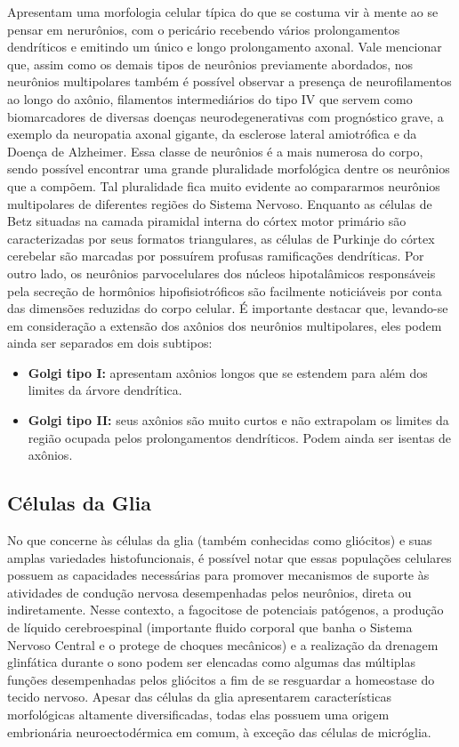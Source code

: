 \documentclass[
]{book}
\providecommand{\tightlist}{%
  \setlength{\itemsep}{0pt}\setlength{\parskip}{0pt}}
\theoremstyle{definition}
\theoremstyle{definition}
\theoremstyle{definition}
\theoremstyle{definition}
\theoremstyle{remark}
\begin{document}
Apresentam uma morfologia celular típica do que se costuma vir à mente ao se pensar em nerurônios, com o pericário recebendo vários prolongamentos dendríticos e emitindo um único e longo prolongamento axonal. Vale mencionar que, assim como os demais tipos de neurônios previamente abordados, nos neurônios multipolares também é possível observar a presença de neurofilamentos ao longo do axônio, filamentos intermediários do tipo IV que servem como biomarcadores de diversas doenças neurodegenerativas com prognóstico grave, a exemplo da neuropatia axonal gigante, da esclerose lateral amiotrófica e da Doença de Alzheimer. Essa classe de neurônios é a mais numerosa do corpo, sendo possível encontrar uma grande pluralidade morfológica dentre os neurônios que a compõem. Tal pluralidade fica muito evidente ao compararmos neurônios multipolares de diferentes regiões do Sistema Nervoso. Enquanto as células de Betz situadas na camada piramidal interna do córtex motor primário são caracterizadas por seus formatos triangulares, as células de Purkinje do córtex cerebelar são marcadas por possuírem profusas ramificações dendríticas. Por outro lado, os neurônios parvocelulares dos núcleos hipotalâmicos responsáveis pela secreção de hormônios hipofisiotróficos são facilmente noticiáveis por conta das dimensões reduzidas do corpo celular. É importante destacar que, levando-se em consideração a extensão dos axônios dos neurônios multipolares, eles podem ainda ser separados em dois subtipos:

\begin{itemize}
\tightlist
\item
  \textbf{Golgi tipo I:} apresentam axônios longos que se estendem para além dos limites da árvore dendrítica.
\item
  \textbf{Golgi tipo II:} seus axônios são muito curtos e não extrapolam os limites da região ocupada pelos prolongamentos dendríticos. Podem ainda ser isentas de axônios.
\end{itemize}

\hypertarget{cuxe9lulas-da-glia}{%
\subsection*{Células da Glia}\label{cuxe9lulas-da-glia}}

No que concerne às células da glia (também conhecidas como gliócitos) e suas amplas variedades histofuncionais, é possível notar que essas populações celulares possuem as capacidades necessárias para promover mecanismos de suporte às atividades de condução nervosa desempenhadas pelos neurônios, direta ou indiretamente. Nesse contexto, a fagocitose de potenciais patógenos, a produção de líquido cerebroespinal (importante fluido corporal que banha o Sistema Nervoso Central e o protege de choques mecânicos) e a realização da drenagem glinfática durante o sono podem ser elencadas como algumas das múltiplas funções desempenhadas pelos gliócitos a fim de se resguardar a homeostase do tecido nervoso. Apesar das células da glia apresentarem características morfológicas altamente diversificadas, todas elas possuem uma origem embrionária neuroectodérmica em comum, à exceção das células de micróglia.
\end{document}
